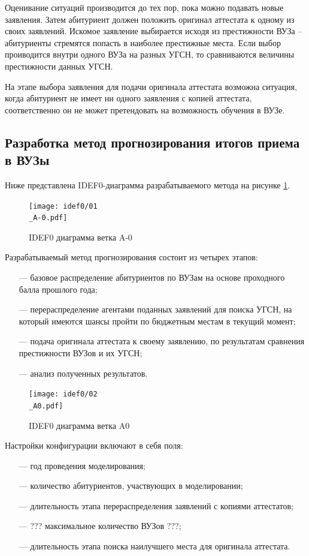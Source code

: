 Оценивание ситуаций производится до тех пор, пока можно подавать новые заявления. Затем абитуриент должен положить оригинал аттестата к одному из своих заявлений. Искомое заявление выбирается исходя из престижности ВУЗа – абитуриенты стремятся попасть в наиболее престижные места. Если выбор проиводится внутри одного ВУЗа на разных УГСН, то сравниваются величины престижности данных УГСН. 

На этапе выбора заявления для подачи оригинала аттестата возможна ситуация, когда абитуриент не имеет ни одного заявления с копией аттестата, соответственно он не может претендовать на возможность обучения в ВУЗе.

\subsection{Разработка метод прогнозирования итогов приема в ВУЗы}

Ниже представлена IDEF0-диаграмма разрабатываемого метода на рисунке  \ref{A-0}.

\begin{figure}[hbtp]
	\centering
	\texttt{[image: idef0/01\\\_A-0.pdf]}
	\caption{IDEF0 диаграмма ветка A-0}
	\label{A-0}
\end{figure}

Разрабатываемый метод прогнозирования состоит из четырех этапов:

\begin{itemize}[leftmargin=1.6\parindent]
	\item[---] базовое распределение абитуриентов по ВУЗам на основе проходного балла прошлого года;
	\item[---] перераспределение агентами поданных заявлений для поиска УГСН, на который имеются шансы пройти по бюджетным местам в текущий момент;
	\item[---] подача оригинала аттестата к своему заявлению, по результатам сравнения престижности ВУЗов и их УГСН;
	\item[---] анализ полученных результатов.
\end{itemize}

\begin{figure}[hbtp]
	\centering
	\texttt{[image: idef0/02\\\_A0.pdf]}
	\caption{IDEF0 диаграмма ветка A0}
	\label{A0}
\end{figure}

Настройки конфигурации включают в себя поля:

\begin{itemize}[leftmargin=1.6\parindent]
	\item[---] год проведения моделирования;
	\item[---] количество абитуриентов, участвующих в моделировании;
	\item[---] длительность этапа перераспределения заявлений с копиями аттестатов;
	\item[---] ??? максимальное количество ВУЗов ???;
	\item[---] длительность этапа поиска наилучшего места для оригинала аттестата.

\end{itemize}

